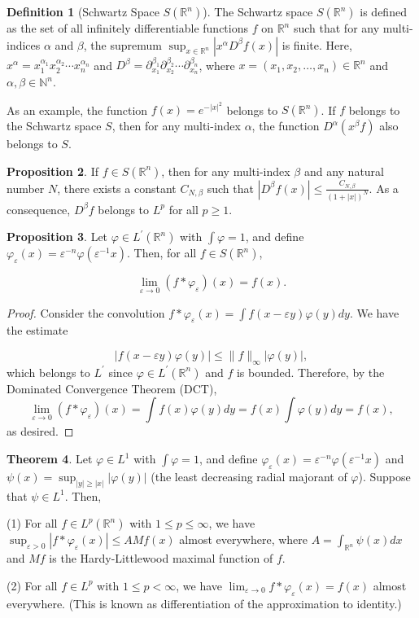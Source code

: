 \documentclass[12pt,openany]{book}
\theoremstyle{definition}
\newtheorem{theorem}{Theorem}[section]
\newtheorem{definition}[theorem]{Definition}
\newtheorem{proposition}[theorem]{Proposition}
\begin{document}
\begin{definition}[Schwartz Space $S(\mathbb{R}^n)$]
    The Schwartz space $S(\mathbb{R}^n)$ is defined as the set of all infinitely differentiable functions $f$ on $\mathbb{R}^n$ such that for any multi-indices $\alpha$ and $\beta$, the supremum
$\sup_{x \in \mathbb{R}^n} |x^\alpha D^\beta f(x)|$
is finite. Here, $x^\alpha = x_1^{\alpha_1} x_2^{\alpha_2} \cdots x_n^{\alpha_n}$ and $D^\beta = \partial_{x_1}^{\beta_1} \partial_{x_2}^{\beta_2} \cdots \partial_{x_n}^{\beta_n}$, where $x = (x_1, x_2, \ldots, x_n) \in \mathbb{R}^n$ and $\alpha, \beta \in \mathbb{N}^n$.
\end{definition}
As an example, the function $f(x) = e^{-|x|^2}$ belongs to $S(\mathbb{R}^n)$.
If $f$ belongs to the Schwartz space $S$, then for any multi-index $\alpha$, the function $D^\alpha(x^\beta f)$ also belongs to $S$.
\begin{proposition}
    If $f \in S(\mathbb{R}^n)$, then for any multi-index $\beta$ and any natural number $N$, there exists a constant $C_{N, \beta}$ such that
$|D^\beta f(x)| \leqslant \frac{C_{N, \beta}}{(1 + |x|)^N}.$
As a consequence, $D^\beta f$ belongs to $L^p$ for all $p \geqslant 1$.
\end{proposition}
\begin{proposition}
Let $\varphi \in L^{\prime}\left(\mathbb{R}^n\right)$ with $\int \varphi = 1$, and define $\varphi_{\varepsilon}(x) = \varepsilon^{-n} \varphi\left(\varepsilon^{-1} x\right)$. Then, for all $f \in S\left(\mathbb{R}^n\right)$,

$$\lim_{\varepsilon \rightarrow 0} (f * \varphi_{\varepsilon})(x) = f(x).$$
\end{proposition}
\begin{proof}
     Consider the convolution $f * \varphi_{\varepsilon}(x) = \int f(x - \varepsilon y) \varphi(y) dy$. We have the estimate

$$|f(x - \varepsilon y) \varphi(y)| \leqslant \|f\|_{\infty}|\varphi(y)|,$$
which belongs to $L^{\prime}$ since $\varphi \in L^{\prime}\left(\mathbb{R}^n\right)$ and $f$ is bounded. Therefore, by the Dominated Convergence Theorem (DCT),
$$\lim_{\varepsilon \rightarrow 0} (f * \varphi_{\varepsilon})(x) = \int f(x) \varphi(y) dy = f(x) \int \varphi(y) dy = f(x),$$
as desired.
\end{proof}
\begin{theorem}
    Let $\varphi \in L^{1}$ with $\int \varphi=1$, and define $\varphi_{\varepsilon}(x)=\varepsilon^{-n} \varphi(\varepsilon^{-1} x)$ and $\psi(x)=\sup _{|y| \geqslant|x|}|\varphi(y)|$ (the least decreasing radial majorant of $\varphi$). Suppose that $\psi \in L^{1}$. Then,

(1) For all $f \in L^p(\mathbb{R}^n)$ with $1 \leqslant p \leqslant \infty$, we have $\sup_{\varepsilon>0}|f * \varphi_{\varepsilon}(x)| \leqslant A Mf(x)$ almost everywhere, where $A=\int_{\mathbb{R}^n} \psi(x) dx$ and $Mf$ is the Hardy-Littlewood maximal function of $f$.

(2) For all $f \in L^p$ with $1 \leqslant p < \infty$, we have $\lim_{\varepsilon \rightarrow 0} f * \varphi_{\varepsilon}(x)=f(x)$ almost everywhere. (This is known as differentiation of the approximation to identity.)
\end{theorem}
\end{document}
